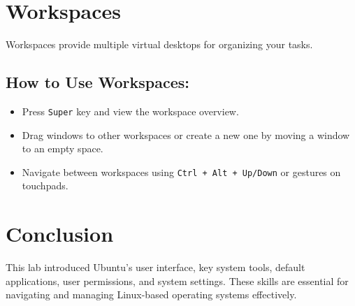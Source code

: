 \documentclass[12pt]{article}
\begin{document}
\section{Workspaces}
Workspaces provide multiple virtual desktops for organizing your tasks.

\subsection*{How to Use Workspaces:}
\begin{itemize}
    \item Press \texttt{Super} key and view the workspace overview.
    \item Drag windows to other workspaces or create a new one by moving a window to an empty space.
    \item Navigate between workspaces using \texttt{Ctrl + Alt + Up/Down} or gestures on touchpads.
\end{itemize}

\section*{Conclusion}
This lab introduced Ubuntu's user interface, key system tools, default applications, user permissions, and system settings. These skills are essential for navigating and managing Linux-based operating systems effectively.
\end{document}
